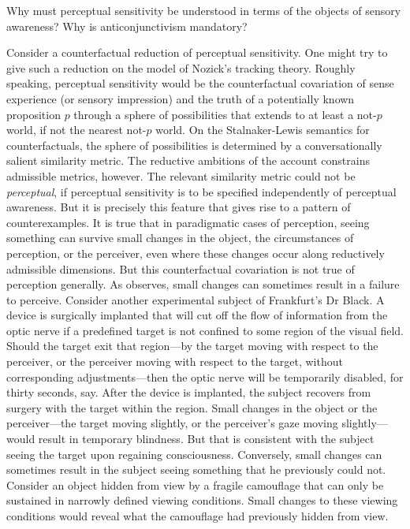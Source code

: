 \documentclass[12pt]{article}
\begin{document}
Why must perceptual sensitivity be understood in terms of the objects of sensory awareness? Why is anticonjunctivism mandatory?

Consider a counterfactual reduction of perceptual sensitivity. One might try to give such a reduction on the model of Nozick's \citeyearpar{Nozick:1981fk} tracking theory. Roughly speaking, perceptual sensitivity would be the counterfactual covariation of sense experience (or sensory impression) and the truth of a potentially known proposition \( p \) through a sphere of possibilities that extends to at least a not-\( p \) world, if not the nearest not-\( p \) world. On the Stalnaker-Lewis semantics for counterfactuals, the sphere of possibilities is determined by a conversationally salient similarity metric. The reductive ambitions of the account constrains admissible metrics, however. The relevant similarity metric could not be \emph{perceptual}, if perceptual sensitivity is to be specified independently of perceptual awareness. But it is precisely this feature that gives rise to a pattern of counterexamples. It is true that in paradigmatic cases of perception, seeing something can survive small changes in the object, the circumstances of perception, or the perceiver, even where these changes occur along reductively admissible dimensions. But this counterfactual covariation is not true of perception generally.  As \citet{Johnston:2006uq} observes, small changes can sometimes result in a failure to perceive. Consider another experimental subject of Frankfurt's \citeyearpar{Frankfurt:1969kx} Dr Black. A device is surgically implanted that will cut off the flow of information from the optic nerve if a predefined target is not confined to some region of the visual field. Should the target exit that region---by the target moving with respect to the perceiver, or the perceiver moving with respect to the target, without corresponding adjustments---then the optic nerve will be temporarily disabled, for thirty seconds, say. After the device is implanted, the subject recovers from surgery with the target within the region. Small changes in the object or the perceiver---the target moving slightly, or the perceiver's gaze moving slightly---would result in temporary blindness. But that is consistent with the subject seeing the target upon regaining consciousness. Conversely, small changes can sometimes result in the subject seeing something that he previously could not. Consider an object hidden from view by a fragile camouflage that can only be sustained in narrowly defined viewing conditions. Small changes to these viewing conditions would reveal what the camouflage had previously hidden from view.
\end{document}
